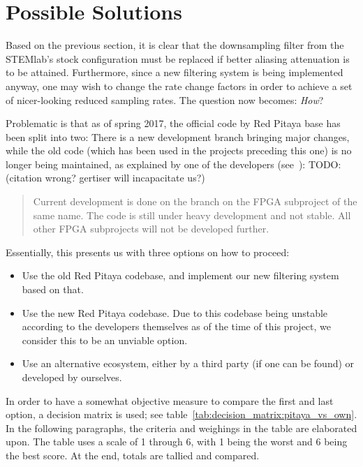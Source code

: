 


\section{Possible Solutions} %
\label{sec:mission:possible_solutions}

Based on the  previous section, it is clear that  the downsampling filter from
the  STEMlab's  stock  configuration  must  be  replaced  if  better  aliasing
attenuation is  to be attained. Furthermore,  since a new filtering  system is
being implemented  anyway, one may wish  to change the rate  change factors in
order to achieve  a set of nicer-looking reduced  sampling rates. The question
now becomes: \emph{How}?

Problematic is that  as of spring 2017,  the official code by  Red Pitaya base
has been  split into  two: There is  a new  development branch  bringing major
changes, while  the old code  (which has been  used in the  projects preceding
this one) is no longer being maintained, as explained by one of the developers
(see~\cite{pita:github:issue:huesser:jeras}): TODO: (citation wrong? gertiser will incapacitate us?)
\begin{quote}
    Current  development  is done  on  the   branch  on  the
    FPGA  subproject of  the same  name.  The  code is  still under  heavy
    development and  not stable. All  other FPGA  subprojects will  not be
    developed further.
\end{quote}

Essentially, this presents us with three options on how to proceed:
\begin{itemize}
    \item
        Use  the old  Red Pitaya  codebase,  and implement  our new  filtering
        system based  on that.
    \item
        Use the new  Red Pitaya codebase. Due to this  codebase being unstable
        according to the developers themselves as of the time of this project,
        we consider this to be an unviable option.
    \item
        Use an alternative  ecosystem, either by a third party  (if one can be
        found) or developed by ourselves.
\end{itemize}
In   order    to   have    a   somewhat    objective   measure    to   compare
the   first   and   last   option,    a   decision   matrix   is   used;   see
table~\ref{tab:decision_matrix:pitaya_vs_own}. In  the  following  paragraphs,
the criteria and weighings in the  table are elaborated upon. The table uses a
scale of  \num{1} through \num{6},  with \num{1}  being the worst  and \num{6}
being the best score. At the end, totals are tallied and compared.


